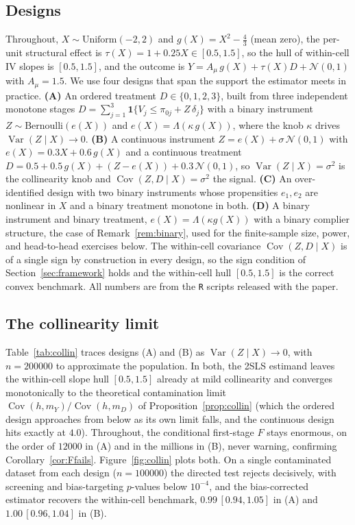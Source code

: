 \documentclass[preprint,11pt,authoryear]{elsarticle}
\theoremstyle{definition}
\newcommand{\Cov}{\operatorname{Cov}}
\newcommand{\Var}{\operatorname{Var}}
\begin{document}
\subsection{Designs}
Throughout, $X\sim\text{Uniform}(-2,2)$ and $g(X)=X^2-\tfrac43$ (mean zero), the
per-unit structural effect is $\tau(X)=1+0.25X\in[0.5,1.5]$, so the hull of within-cell
IV slopes is $[0.5,1.5]$, and the outcome is $Y=A_\mu\,g(X)+\tau(X)D+\mathcal N(0,1)$
with $A_\mu=1.5$. We use four designs that span the support the estimator meets in
practice. \textbf{(A)} An ordered treatment
$D\in\{0,1,2,3\}$, built from three independent monotone stages
$D=\sum_{j=1}^3\mathbf 1\{V_j\le\pi_{0j}+Z\,\delta_j\}$ with a binary instrument
$Z\sim\text{Bernoulli}(e(X))$ and $e(X)=\Lambda(\kappa\,g(X))$, where the knob $\kappa$
drives $\Var(Z\mid X)\to0$. \textbf{(B)} A continuous instrument
$Z=e(X)+\sigma\,\mathcal N(0,1)$ with $e(X)=0.3X+0.6\,g(X)$ and a continuous
treatment $D=0.5+0.5\,g(X)+(Z-e(X))+0.3\,\mathcal N(0,1)$, so $\Var(Z\mid X)=\sigma^2$ is
the collinearity knob and $\Cov(Z,D\mid X)=\sigma^2$ the signal. \textbf{(C)} An
over-identified design with two binary instruments whose propensities
$e_1,e_2$ are nonlinear in $X$ and a binary treatment monotone in both. \textbf{(D)} A
binary instrument and binary treatment, $e(X)=\Lambda(\kappa g(X))$ with a binary
complier structure, the case of Remark~\ref{rem:binary}, used for the finite-sample
size, power, and head-to-head exercises below. The within-cell covariance
$\Cov(Z,D\mid X)$ is of a single sign by construction in every design, so the sign
condition of Section~\ref{sec:framework} holds and the within-cell hull $[0.5,1.5]$ is
the correct convex benchmark. All numbers are from the \texttt{R} scripts released with
the paper.

\subsection{The collinearity limit}
Table~\ref{tab:collin} traces designs (A) and (B) as $\Var(Z\mid X)\to0$, with
$n=\num{200000}$ to approximate the population. In both, the 2SLS
estimand leaves the within-cell slope hull $[0.5,1.5]$ already at mild collinearity and
converges monotonically to the theoretical contamination limit
$\Cov(h,m_Y)/\Cov(h,m_D)$ of Proposition~\ref{prop:collin} (which the ordered design
approaches from below as its own limit falls, and the continuous design hits exactly at
$4.0$). Throughout, the conditional first-stage $F$ stays enormous, on the order of
$\num{12000}$ in (A) and in the millions in (B), never warning, confirming
Corollary~\ref{cor:Ffails}. Figure~\ref{fig:collin} plots both. On a single contaminated
dataset from each design ($n=\num{100000}$) the directed test rejects decisively, with
screening and bias-targeting $p$-values below $10^{-4}$, and the bias-corrected estimator
recovers the within-cell benchmark, $0.99\,[0.94,1.05]$ in (A) and $1.00\,[0.96,1.04]$ in
(B).
\end{document}
